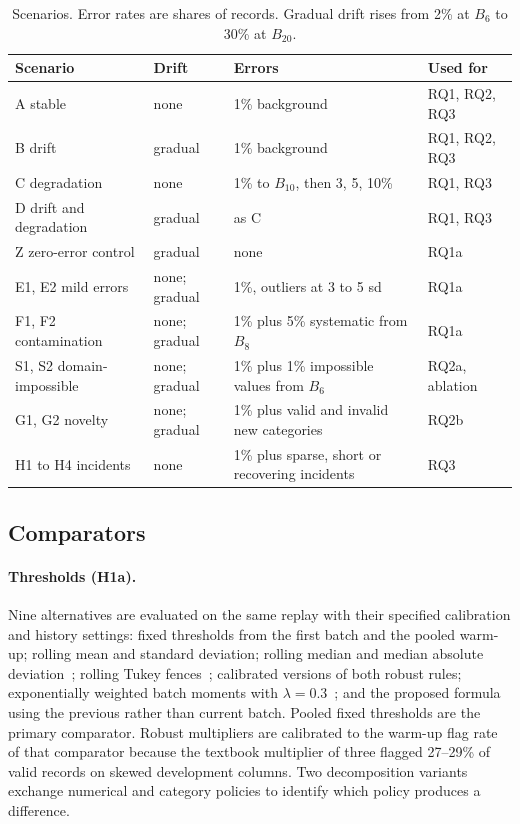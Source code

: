 \begin{table}[t]
\caption{Scenarios. Error rates are shares of records. Gradual drift rises from 2\% at $B_6$ to 30\% at $B_{20}$.}
\label{tab:scenarios}
\small
\begin{tabularx}{\linewidth}{@{}llXl@{}}
\toprule
Scenario & Drift & Errors & Used for \\
\midrule
A stable & none & 1\% background & RQ1, RQ2, RQ3 \\
B drift & gradual & 1\% background & RQ1, RQ2, RQ3 \\
C degradation & none & 1\% to $B_{10}$, then 3, 5, 10\% & RQ1, RQ3 \\
D drift and degradation & gradual & as C & RQ1, RQ3 \\
Z zero-error control & gradual & none & RQ1a \\
E1, E2 mild errors & none; gradual & 1\%, outliers at 3 to 5 sd & RQ1a \\
F1, F2 contamination & none; gradual & 1\% plus 5\% systematic from $B_8$ & RQ1a \\
S1, S2 domain-impossible & none; gradual & 1\% plus 1\% impossible values from $B_6$ & RQ2a, ablation \\
G1, G2 novelty & none; gradual & 1\% plus valid and invalid new categories & RQ2b \\
H1 to H4 incidents & none & 1\% plus sparse, short or recovering incidents & RQ3 \\
\bottomrule
\end{tabularx}
\end{table}

\subsection{Comparators}
\label{sec:design:comparators}

\paragraph{Thresholds (H1a).} Nine alternatives are evaluated on the same replay with their specified calibration and history settings: fixed thresholds from the first batch and the pooled warm-up; rolling mean and standard deviation; rolling median and median absolute deviation~\cite{Leys2013}; rolling Tukey fences~\cite{Tukey1977}; calibrated versions of both robust rules; exponentially weighted batch moments with $\lambda=0.3$~\cite{Roberts1959}; and the proposed formula using the previous rather than current batch. Pooled fixed thresholds are the primary comparator. Robust multipliers are calibrated to the warm-up flag rate of that comparator because the textbook multiplier of three flagged 27--29\% of valid records on skewed development columns. Two decomposition variants exchange numerical and category policies to identify which policy produces a difference.

